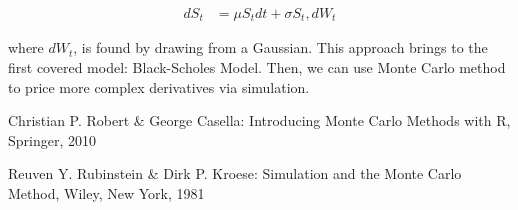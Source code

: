 \documentclass[paper=a4, fontsize=12pt]{scrartcl} %
\numberwithin{equation}{section}
\begin{document}
		\begin{equation}	
		\begin{aligned}
			dS_{t}&=\mu S_{t}dt+\sigma S_{t},dW_{t} 
		\end{aligned}
		\end{equation}
	
where $dW_{t}$, is found by drawing from a Gaussian. This approach brings to the first covered model: Black-Scholes Model.
Then, we can use Monte Carlo method to price more complex derivatives via simulation.


























\newpage

\begin{thebibliography}{9}


Christian P. Robert \& George Casella: Introducing Monte Carlo Methods with R, Springer, 2010

Reuven Y. Rubinstein \& Dirk P. Kroese: Simulation and the Monte Carlo Method, Wiley, New York, 1981


\end{thebibliography}
\end{document}
